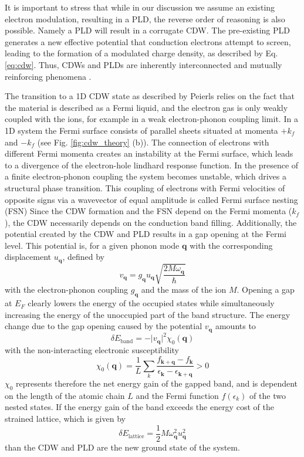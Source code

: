 It is important to stress that while in our discussion we assume an existing electron modulation, resulting in a PLD, the reverse order of reasoning is also possible.
Namely a PLD will result in a corrugate CDW.
The pre-existing PLD generates a new effective potential that conduction electrons attempt to screen, leading to the formation of a modulated charge density, as described by Eq. \ref{eq:cdw}.
Thus, CDWs and PLDs are inherently interconnected and mutually reinforcing phenomena \cite{rossnagel_origin_2011, chan_spin_1973, johannes_fermi_2008}.

The transition to a 1D CDW state as described by Peierls relies on the fact that the material is described as a Fermi liquid, and the electron gas is only weakly coupled with the ions, for example in a weak electron-phonon coupling limit.
In a 1D system the Fermi surface consists of parallel sheets situated at momenta $+k_f$ and $-k_f$ (see Fig. \ref{fig:cdw_theory} (b)).
The connection of electrons with different Fermi momenta creates an instability at the Fermi surface, which leads to a divergence of the electron-hole lindhard response function.
In the presence of a finite electron-phonon coupling the system becomes unstable, which drives a structural phase transition.
This coupling of electrons with Fermi velocities of opposite signs via a wavevector of equal amplitude is called Fermi surface nesting (FSN)
Since the CDW formation and the FSN depend on the Fermi momenta ($k_f$), the CDW necessarily depends on the conduction band filling.
Additionally, the potential created by the CDW and PLD results in a gap opening at the Fermi level.
This potential is, for a given phonon mode $\mathbf{q}$ with the corresponding displacement $u_\mathbf{q}$, defined by
\begin{equation}
	v_\mathbf{q} = g_\mathbf{q} u_\mathbf{q} \sqrt{\frac{2M\omega_\mathbf{q}}{\hbar}}
\end{equation}
with the electron-phonon coupling $g_\mathbf{q}$ and the mass of the ion $M$.
Opening a gap at $E_F$ clearly lowers the energy of the occupied states while simultaneously increasing the energy of the unoccupied part of the band structure.
The energy change due to the gap opening caused by the potential $v_\mathbf{q}$ amounts to
\begin{equation}
	\delta E_\text{band} = -\lvert v_\mathbf{q}\rvert^2 \chi_0(\mathbf{q})
\end{equation}
with the non-interacting electronic susceptibility
\begin{equation}
	\chi_0(\mathbf{q}) = \frac{1}{L} \sum_{k}^{} \frac{f_{\mathbf{k}+\mathbf{q}}-f_\mathbf{k}}{\epsilon_\mathbf{k}-\epsilon_{\mathbf{k}+\mathbf{q}}}>0
	\label{eq:susz}
\end{equation}
$\chi_0$ represents therefore the net energy gain of the gapped band, and is dependent on the length of the atomic chain $L$ and the Fermi function $f(\epsilon_k)$ of the two nested states.
If the energy gain of the band exceeds the energy cost of the  strained lattice, which is given by
\begin{equation}
	\delta E_\text{lattice} = \frac{1}{2} M\omega_\mathbf{q}^2 u_\mathbf{q}^2
\end{equation}
than the CDW and PLD are the new ground state of the system.

